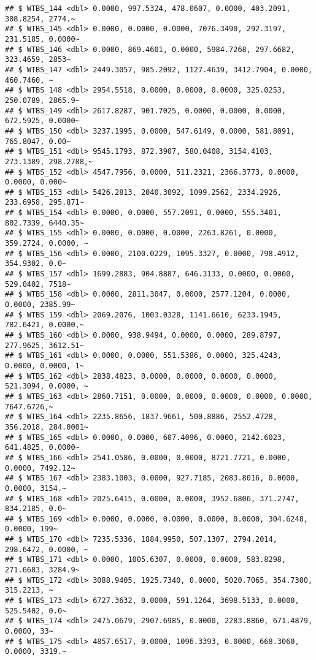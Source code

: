 \documentclass[
]{article}
\begin{document}
\begin{verbatim}
## $ WTBS_144 <dbl> 0.0000, 997.5324, 478.0607, 0.0000, 403.2091, 308.8254, 2774.~
## $ WTBS_145 <dbl> 0.0000, 0.0000, 0.0000, 7076.3490, 292.3197, 231.5185, 0.0000~
## $ WTBS_146 <dbl> 0.0000, 869.4601, 0.0000, 5984.7268, 297.6682, 323.4659, 2853~
## $ WTBS_147 <dbl> 2449.3057, 985.2092, 1127.4639, 3412.7904, 0.0000, 460.7460, ~
## $ WTBS_148 <dbl> 2954.5518, 0.0000, 0.0000, 0.0000, 325.0253, 250.0789, 2865.9~
## $ WTBS_149 <dbl> 2617.8287, 901.7025, 0.0000, 0.0000, 0.0000, 672.5925, 0.0000~
## $ WTBS_150 <dbl> 3237.1995, 0.0000, 547.6149, 0.0000, 581.8091, 765.8047, 0.00~
## $ WTBS_151 <dbl> 9545.1793, 872.3907, 580.0408, 3154.4103, 273.1389, 298.2788,~
## $ WTBS_152 <dbl> 4547.7956, 0.0000, 511.2321, 2366.3773, 0.0000, 0.0000, 0.000~
## $ WTBS_153 <dbl> 5426.2813, 2040.3092, 1099.2562, 2334.2926, 233.6958, 295.871~
## $ WTBS_154 <dbl> 0.0000, 0.0000, 557.2091, 0.0000, 555.3401, 802.7339, 6440.35~
## $ WTBS_155 <dbl> 0.0000, 0.0000, 0.0000, 2263.8261, 0.0000, 359.2724, 0.0000, ~
## $ WTBS_156 <dbl> 0.0000, 2100.0229, 1095.3327, 0.0000, 798.4912, 354.9302, 0.0~
## $ WTBS_157 <dbl> 1699.2883, 904.8887, 646.3133, 0.0000, 0.0000, 529.0402, 7518~
## $ WTBS_158 <dbl> 0.0000, 2811.3047, 0.0000, 2577.1204, 0.0000, 0.0000, 2385.99~
## $ WTBS_159 <dbl> 2069.2076, 1003.0328, 1141.6610, 6233.1945, 782.6421, 0.0000,~
## $ WTBS_160 <dbl> 0.0000, 938.9494, 0.0000, 0.0000, 289.8797, 277.9625, 3612.51~
## $ WTBS_161 <dbl> 0.0000, 0.0000, 551.5386, 0.0000, 325.4243, 0.0000, 0.0000, 1~
## $ WTBS_162 <dbl> 2838.4823, 0.0000, 0.0000, 0.0000, 0.0000, 521.3094, 0.0000, ~
## $ WTBS_163 <dbl> 2860.7151, 0.0000, 0.0000, 0.0000, 0.0000, 0.0000, 7647.6726,~
## $ WTBS_164 <dbl> 2235.8656, 1837.9661, 500.8886, 2552.4728, 356.2018, 284.0001~
## $ WTBS_165 <dbl> 0.0000, 0.0000, 607.4096, 0.0000, 2142.6023, 641.4825, 0.0000~
## $ WTBS_166 <dbl> 2541.0586, 0.0000, 0.0000, 8721.7721, 0.0000, 0.0000, 7492.12~
## $ WTBS_167 <dbl> 2383.1003, 0.0000, 927.7185, 2083.8016, 0.0000, 0.0000, 3154.~
## $ WTBS_168 <dbl> 2025.6415, 0.0000, 0.0000, 3952.6806, 371.2747, 834.2185, 0.0~
## $ WTBS_169 <dbl> 0.0000, 0.0000, 0.0000, 0.0000, 0.0000, 304.6248, 0.0000, 199~
## $ WTBS_170 <dbl> 7235.5336, 1884.9950, 507.1307, 2794.2014, 298.6472, 0.0000, ~
## $ WTBS_171 <dbl> 0.0000, 1005.6307, 0.0000, 0.0000, 583.8298, 271.6683, 3284.9~
## $ WTBS_172 <dbl> 3088.9405, 1925.7340, 0.0000, 5020.7065, 354.7300, 315.2213, ~
## $ WTBS_173 <dbl> 6727.3632, 0.0000, 591.1264, 3698.5133, 0.0000, 525.5402, 0.0~
## $ WTBS_174 <dbl> 2475.0679, 2907.6985, 0.0000, 2283.8860, 671.4879, 0.0000, 33~
## $ WTBS_175 <dbl> 4857.6517, 0.0000, 1096.3393, 0.0000, 668.3060, 0.0000, 3319.~

\end{verbatim}
\end{document}
